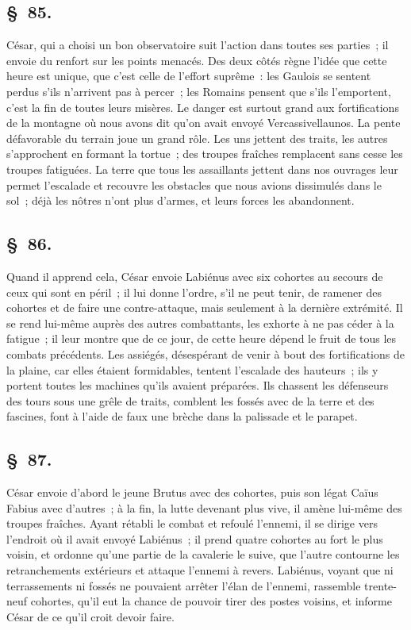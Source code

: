 \documentclass[french,twoside]{book} %
\begin{document}
\subsection[{§ 85.}]{ \textsc{§ 85.} }
\noindent César, qui a choisi un bon observatoire suit l’action dans toutes ses parties ; il envoie du renfort sur les points menacés. Des deux côtés règne l’idée que cette heure est unique, que c’est celle de l’effort suprême : les Gaulois se sentent perdus s’ils n’arrivent pas à percer ; les Romains pensent que s’ils l’emportent, c’est la fin de toutes leurs misères. Le danger est surtout grand aux fortifications de la montagne où nous avons dit qu’on avait envoyé Vercassivellaunos. La pente défavorable du terrain joue un grand rôle. Les uns jettent des traits, les autres s’approchent en formant la tortue ; des troupes fraîches remplacent sans cesse les troupes fatiguées. La terre que tous les assaillants jettent dans nos ouvrages leur permet l’escalade et recouvre les obstacles que nous avions dissimulés dans le sol ; déjà les nôtres n’ont plus d’armes, et leurs forces les abandonnent.
\subsection[{§ 86.}]{ \textsc{§ 86.} }
\noindent Quand il apprend cela, César envoie Labiénus avec six cohortes au secours de ceux qui sont en péril ; il lui donne l’ordre, s’il ne peut tenir, de ramener des cohortes et de faire une contre-attaque, mais seulement à la dernière extrémité. Il se rend lui-même auprès des autres combattants, les exhorte à ne pas céder à la fatigue ; il leur montre que de ce jour, de cette heure dépend le fruit de tous les combats précédents. Les assiégés, désespérant de venir à bout des fortifications de la plaine, car elles étaient formidables, tentent l’escalade des hauteurs ; ils y portent toutes les machines qu’ils avaient préparées. Ils chassent les défenseurs des tours sous une grêle de traits, comblent les fossés avec de la terre et des fascines, font à l’aide de faux une brèche dans la palissade et le parapet.
\subsection[{§ 87.}]{ \textsc{§ 87.} }
\noindent César envoie d’abord le jeune Brutus avec des cohortes, puis son légat Caïus Fabius avec d’autres ; à la fin, la lutte devenant plus vive, il amène lui-même des troupes fraîches. Ayant rétabli le combat et refoulé l’ennemi, il se dirige vers l’endroit où il avait envoyé Labiénus ; il prend quatre cohortes au fort le plus voisin, et ordonne qu’une partie de la cavalerie le suive, que l’autre contourne les retranchements extérieurs et attaque l’ennemi à revers. Labiénus, voyant que ni terrassements ni fossés ne pouvaient arrêter l’élan de l’ennemi, rassemble trente-neuf cohortes, qu’il eut la chance de pouvoir tirer des postes voisins, et informe César de ce qu’il croit devoir faire.
\end{document}
